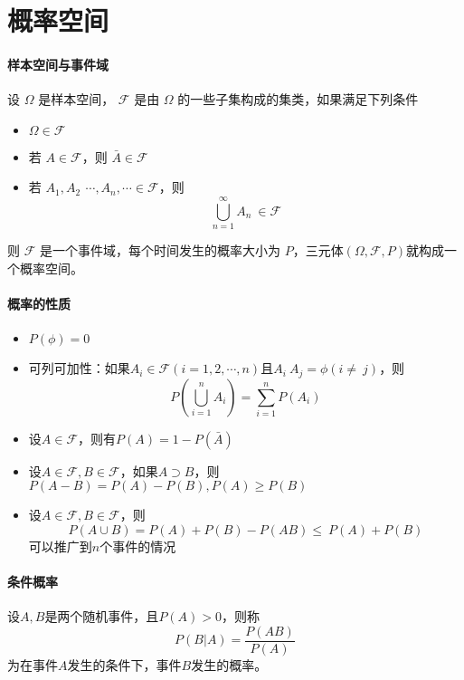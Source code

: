 \section{概率空间}

\paragraph{样本空间与事件域}
设 $\Omega$ 是样本空间， $\mathcal{F}$ 是由 $\Omega$ 的一些子集构成的集类，如果满足下列条件
\begin{itemize}[leftmargin=\paritemindent]
    \item $\Omega \in \mathcal{F}$
    \item 若 $A\in\mathcal{F}$，则 $\bar{A}\in\mathcal{F}$
    \item 若 $A_1,A_2\ \,\cdots,A_n,\cdots\in\mathcal{F}$，则
     $$ \bigcup_{n=1}^\infty A_n\ \in\mathcal{F} $$ 
\end{itemize}
则 $\mathcal{F}$ 是一个事件域，每个时间发生的概率大小为 $P$，三元体$(\Omega,\mathcal{F},P)$就构成一个概率空间。

\paragraph{概率的性质}
\begin{itemize}[leftmargin=\paritemindent]
    \item $P(\phi)=0$
	\item 可列可加性：如果$A_i\in\mathcal{F}(i=1,2,\cdots,n)$且$A_i\ A_j=\phi(i\neq\ j)$，则
     $$ P\left(\bigcup_{i=1}^n A_i \right)=\sum_{i=1}^n P(A_i )  $$ 
    \item 设$A\in\mathcal{F}$，则有$P(A)=1-P(\bar{A})$
    \item 设$A\in\mathcal{F},B\in\mathcal{F}$，如果$A\supset B$，则$P(A-B)=P(A)-P(B),P(A)\geq P(B)$
    \item 设$A\in\mathcal{F},B\in\mathcal{F}$，则
     $$ P(A\cup B)=P(A)+P(B)-P(AB)\le\ P(A)+P(B) $$ 
    可以推广到$n$个事件的情况
\end{itemize}

\paragraph{条件概率} 设$A,B$是两个随机事件，且$P(A)>0$，则称
\begin{equation}
    P(B | A)=\frac{P(AB)}{P(A)}
\end{equation}
为在事件$A$发生的条件下，事件$B$发生的概率。

